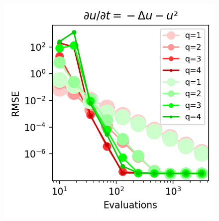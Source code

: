 \begin{figure}
    \caption{}
    \label{fig:heat medium}
    \includegraphics[width=\columnwidth]{../images/solver_heat and big square.png}
    \caption{}
    \label{fig:heat big}
\end{figure}
